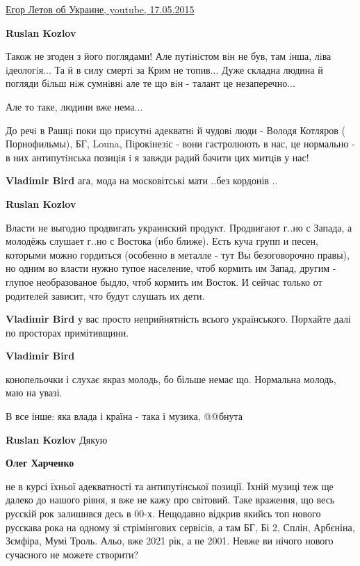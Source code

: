 \begin{itemize}
\begin{itemize}
\href{https://youtu.be/xQCSmPLtYAs}{%
Егор Летов об Украине, youtube, 17.05.2015%
}

\textbf{Ruslan Kozlov} 

Також не згоден з його поглядами! Але путiнiстом вiн не був, там iнша, лiва
iдеологiя... Та й в силу смертi за Крим не топив... Дуже складна людина й погляди
бiльш нiж сумнiвнi але те що вiн - талант це незаперечно...

Але то таке, людини вже нема...

До речi в Рашцi поки що присутнi адекватнi й чудовi люди - Володя Котляров (
Порнофильмы), БГ, Louna, Пiрокiнезiс - вони гастролюють в нас, це нормально - в
них антипутiнська позицiя i я завжди радий бачити цих митцiв у нас!

\textbf{Vladimir Bird} ага, мода на московітські мати ..без кордонів ..

\textbf{Ruslan Kozlov} 

Власти не выгодно продвигать украинский продукт. Продвигают г..но с Запада, а
молодёжь слушает г..но с Востока (ибо ближе). Есть куча групп и песен, которыми
можно гордиться (особенно в металле - тут Вы безоговорочно правы), но одним во
власти нужно тупое население, чтоб кормить им Запад, другим - глупое
необразованое быдло, чтоб кормить им Восток. И сейчас только от родителей
зависит, что будут слушать их дети.

\textbf{Vladimir Bird} у вас просто неприйнятність всього українського. Порхайте далі по просторах примітивщини.

\textbf{Vladimir Bird} 

конопельочки і слухає якраз молодь, бо більше немає що. Нормальна молодь, маю
на увазі.

В все інше: яка влада і країна - така і музика, @@бнута

\textbf{Ruslan Kozlov} Дякую

\textbf{Олег Харченко} 

не в курсі їхньої адекватності та антипутінської позиції. Їхній музиці теж ще
далеко до нашого рівня, я вже не кажу про світовий. Таке враження, що весь
русскій рок залишився десь в 00-х. Нещодавно відкрив якийсь топ нового русскава
рока на одному зі стрімінгових сервісів, а там БГ, Бі 2, Сплін, Арбєніна,
Зємфіра, Мумі Троль. Альо, вже 2021 рік, а не 2001. Невже ви нічого нового
сучасного не можете створити?


\end{itemize}
\end{itemize}
